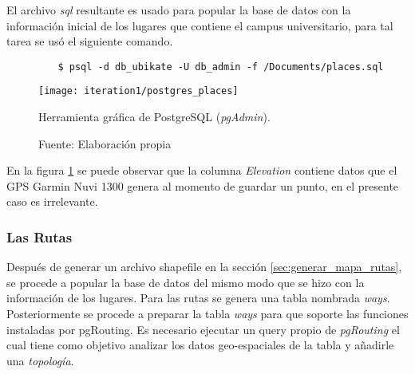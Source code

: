        El archivo \emph{sql} resultante es usado para popular la base de datos con la información inicial de los lugares que contiene el campus universitario, para tal tarea se usó el siguiente comando.\\

       \begin{verbatim}
         $ psql -d db_ubikate -U db_admin -f /Documents/places.sql
       \end{verbatim}

       \begin{figure}[H]
         \begin{center}
           \texttt{[image: iteration1/postgres\_places]}
           \caption{Herramienta gráfica de PostgreSQL (\emph{pgAdmin}).}
           \label{fig:postgres_places}
           \caption*{Fuente: Elaboración propia}
         \end{center}
       \end{figure}

       En la figura \ref{fig:postgres_places} se puede observar que la columna \emph{Elevation} contiene datos que el GPS Garmin Nuvi 1300 genera al momento de guardar un punto, en el presente caso es irrelevante.\\



       \subsubsection{Las Rutas}
       \label{subs:Las Rutas}

       Después de generar un archivo shapefile en la sección \ref{sec:generar_mapa_rutas}, se procede a popular la base de datos del mismo modo que se hizo con la información de los lugares. Para las rutas se genera una tabla nombrada \emph{ways}.\\

       Posteriormente se procede a preparar la tabla \emph{ways} para que soporte las funciones instaladas por pgRouting.
       Es necesario ejecutar un query propio de \emph{pgRouting} el cual tiene como objetivo analizar los datos geo-espaciales de la tabla y añadirle una \emph{topología}.\\

